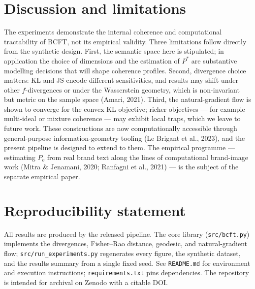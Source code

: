 \documentclass[11pt]{article}
\theoremstyle{remark}
\newcommand{\Pstar}{P^{*}}
\begin{document}
\section{Discussion and limitations}
The experiments demonstrate the internal coherence and computational
tractability of BCFT, not its empirical validity. Three limitations follow
directly from the synthetic design. First, the semantic space here is
stipulated; in application the choice of dimensions and the estimation of
$\Pstar$ are substantive modelling decisions that will shape coherence profiles.
Second, divergence choice matters: KL and JS encode different sensitivities, and
results may shift under other $f$-divergences or under the Wasserstein geometry,
which is non-invariant but metric on the sample space (Amari, 2021). Third,
the natural-gradient flow is shown to converge for the convex KL objective;
richer objectives --- for example multi-ideal or mixture coherence --- may
exhibit local traps, which we leave to future work. These constructions are now
computationally accessible through general-purpose information-geometry tooling
(Le Brigant et al., 2023), and the present pipeline is designed to extend to
them. The empirical programme --- estimating $P_o$ from real brand text along
the lines of computational brand-image work (Mitra \& Jenamani, 2020; Ranfagni
et al., 2021) --- is the subject of the separate empirical paper.

\section*{Reproducibility statement}
All results are produced by the released pipeline. The core library
(\texttt{src/bcft.py}) implements the divergences, Fisher--Rao distance,
geodesic, and natural-gradient flow; \texttt{src/run\_experiments.py}
regenerates every figure, the synthetic dataset, and the results summary from a
single fixed seed. See \texttt{README.md} for environment and execution
instructions; \texttt{requirements.txt} pins dependencies. The repository is
intended for archival on Zenodo with a citable DOI.
\end{document}
